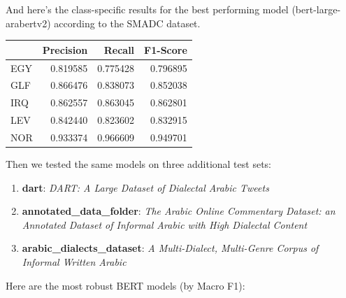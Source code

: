 \documentclass[12pt]{diazessay}
\begin{document}
    \vskip0.5cm
    And here's the class-specific results for the best performing model (bert-large-arabertv2) according to the SMADC dataset.
    \vskip0.5cm
    \hskip1.9cm
    \begin{tabular}{lrrr}
    \toprule
    {} &  Precision &    Recall &  F1-Score \\
    \midrule
    EGY &   0.819585 &  0.775428 &  0.796895 \\
    GLF &   0.866476 &  0.838073 &  0.852038 \\
    IRQ &   0.862557 &  0.863045 &  0.862801 \\
    LEV &   0.842440 &  0.823602 &  0.832915 \\
    NOR &   0.933374 &  0.966609 &  0.949701 \\
    \bottomrule
    \end{tabular}
    \vskip0.5cm


    \vskip0.5cm
     \label{txt:res}
    Then we tested the same models on three additional test sets:
    \begin{enumerate}
        \item \textbf{dart}: \emph{DART: A Large Dataset of Dialectal Arabic Tweets}\cite{alsarsour-etal-2018-dart}
        \item \textbf{annotated\_data\_folder}: \emph{The Arabic Online Commentary Dataset:
an Annotated Dataset of Informal Arabic with High Dialectal Content}\cite{zaidan_burch}
        \item \textbf{arabic\_dialects\_dataset}: \emph{A Multi-Dialect, Multi-Genre Corpus of Informal Written Arabic}\cite{cotterell-callison-burch-2014-multi}
    \end{enumerate}
    
    Here are the most robust BERT models (by Macro F1):
    \vskip0.5cm
    \hskip-0.7cm
\end{document}
